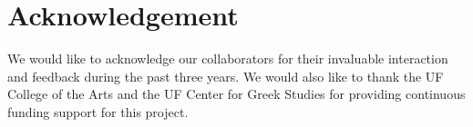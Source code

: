 \documentclass[amsthm,ebook]{saparticle}
\begin{document}
\section*{Acknowledgement}

\noindent We would like to acknowledge our collaborators for their invaluable interaction and feedback during the past three
years. We would also like to thank the UF College of the Arts and the UF Center for Greek Studies for providing
continuous funding support for this project. 



\end{document}
